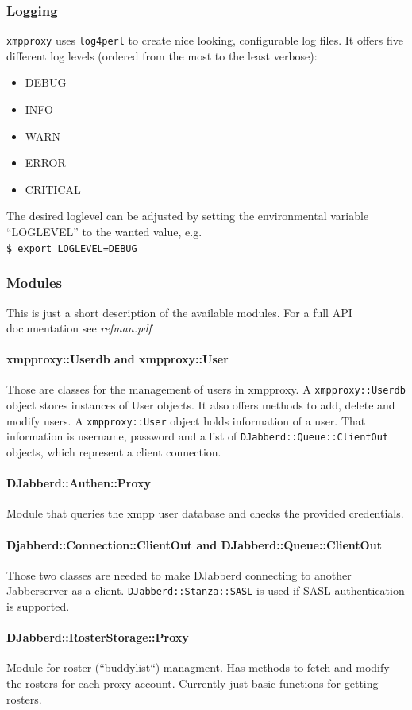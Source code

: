 \documentclass[a4paper,10pt,numbers=noendperiod]{scrartcl}
\begin{document}
\subsubsection{Logging}
	\texttt{xmpproxy} uses \texttt{log4perl} to create nice looking, configurable log files. It offers five different log levels (ordered from the most to the least verbose):
	\begin{itemize}
		\item DEBUG
		\item INFO
		\item WARN
		\item ERROR
		\item CRITICAL
	\end{itemize}
	The desired loglevel can be adjusted by setting the environmental variable ``LOGLEVEL'' to the wanted value, e.g.\\ \texttt{\$ export LOGLEVEL=DEBUG}
		

\subsubsection{Modules}
This is just a short description of the available modules. For a full API documentation see \textit{refman.pdf}
	\paragraph{xmpproxy::Userdb and xmpproxy::User} 
	Those are classes for the management of users in xmpproxy. A \texttt{xmpproxy::Userdb} object stores instances of User objects. It also offers methods to add, delete and modify users. A \texttt{xmpproxy::User} object holds information of a user. That information is username, password and a list of \texttt{DJabberd::Queue::ClientOut} objects, which represent a client connection.
	\paragraph{DJabberd::Authen::Proxy}
	Module that queries the xmpp user database and checks the provided credentials.
	\paragraph{Djabberd::Connection::ClientOut and DJabberd::Queue::ClientOut}
	Those two classes are needed to make DJabberd connecting to another Jabberserver as a client. \texttt{DJabberd::Stanza::SASL} is used if SASL authentication is supported. 
	\paragraph{DJabberd::RosterStorage::Proxy}
	Module for roster (``buddylist``) managment. Has methods to fetch and modify the rosters for each proxy account. Currently just basic functions for getting rosters.
\end{document}
